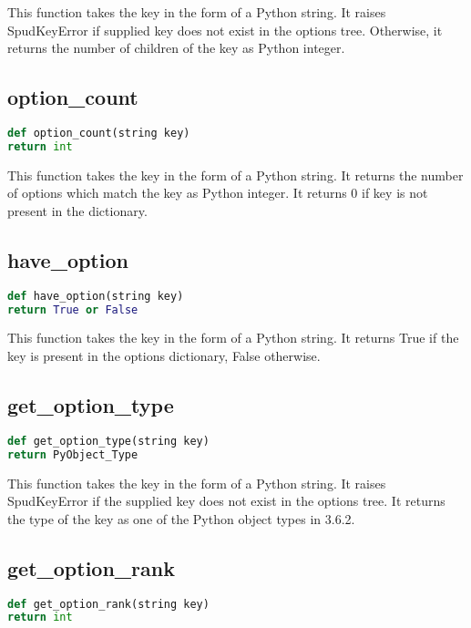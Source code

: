 \documentclass[a4paper, 11pt]{book}
\begin{document}
This function takes the key in the form of a Python string.
It raises SpudKeyError if supplied key does not exist in the options tree.
Otherwise, it returns the number of children of the key as Python integer.

\subsection{option\_count}

\begin{lstlisting}[language=Python]
def option_count(string key)
return int
\end{lstlisting}

This function takes the key in the form of a Python string.
It returns the number of options which match the key as Python integer.
It returns 0 if key is not present in the dictionary.

\subsection{have\_option}

\begin{lstlisting}[language=Python]
def have_option(string key)
return True or False
\end{lstlisting}

This function takes the key in the form of a Python string.
It returns True if the key is present in the options dictionary, False otherwise.

\subsection{get\_option\_type}

\begin{lstlisting}[language=Python]
def get_option_type(string key)
return PyObject_Type
\end{lstlisting}

This function takes the key in the form of a Python string.
It raises SpudKeyError if the supplied key does not exist in the options tree.
It returns the type of the key as one of the Python object types in 3.6.2.

\subsection{get\_option\_rank}

\begin{lstlisting}[language=Python]
def get_option_rank(string key)
return int
\end{lstlisting}
\end{document}
